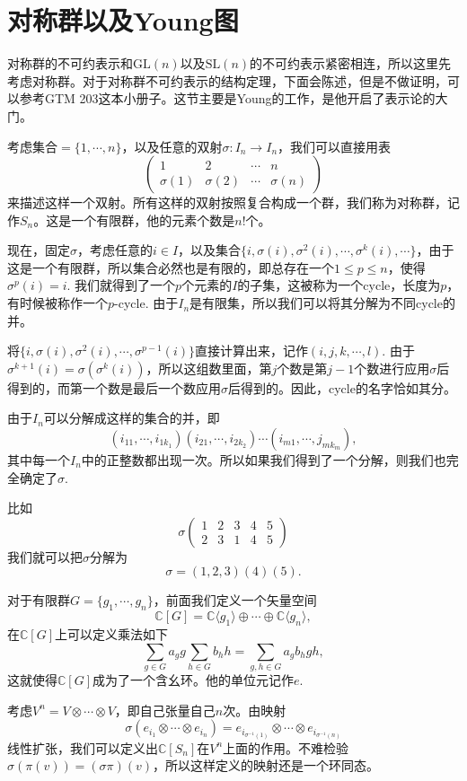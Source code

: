 \documentclass[9pt]{extarticle}
\newcommand{\cc}{\mathbb{C}}
\begin{document}
\section{对称群以及Young图}

对称群的不可约表示和$\mathrm{GL}(n)$以及$\mathrm{SL}(n)$的不可约表示紧密相连，所以这里先考虑对称群。对于对称群不可约表示的结构定理，下面会陈述，但是不做证明，可以参考GTM 203这本小册子。这节主要是Young的工作，是他开启了表示论的大门。

\para 考虑集合$=\{1,\cdots,n\}$，以及任意的双射$\sigma : I_n\to I_n$，我们可以直接用表
\[
	\begin{pmatrix}
	1&2&\cdots &n\\
	\sigma(1)&\sigma(2)&\cdots &\sigma(n)
	\end{pmatrix}
\]
来描述这样一个双射。所有这样的双射按照复合构成一个群，我们称为对称群，记作$S_n$。这是一个有限群，他的元素个数是$n!$个。

现在，固定$\sigma$，考虑任意的$i\in I$，以及集合$\{i,\sigma(i),\sigma^2(i),\cdots,\sigma^k(i),\cdots\}$，由于这是一个有限群，所以集合必然也是有限的，即总存在一个$1\leq p\leq n$，使得$\sigma^p(i)=i$. 我们就得到了一个$p$个元素的$I$的子集，这被称为一个cycle，长度为$p$，有时候被称作一个$p$-cycle. 由于$I_n$是有限集，所以我们可以将其分解为不同cycle的并。

将$\{i,\sigma(i),\sigma^2(i),\cdots,\sigma^{p-1}(i)\}$直接计算出来，记作$(i,j,k,\cdots,l)$. 由于$\sigma^{k+1}(i)=\sigma(\sigma^k(i))$，所以这组数里面，第$j$个数是第$j-1$个数进行应用$\sigma$后得到的，而第一个数是最后一个数应用$\sigma$后得到的。因此，cycle的名字恰如其分。

由于$I_n$可以分解成这样的集合的并，即
\[
	(i_{11},\cdots,i_{1k_1})(i_{21},\cdots,i_{2k_2})\cdots (i_{m1},\cdots,j_{mk_m}),
\]
其中每一个$I_n$中的正整数都出现一次。所以如果我们得到了一个分解，则我们也完全确定了$\sigma$.

比如
\[
	\sigma\begin{pmatrix}
	1&2&3&4&5\\
	2&3&1&4&5
	\end{pmatrix}
\]
我们就可以把$\sigma$分解为
\[
	\sigma=(1,2,3)(4)(5).
\]

\para 对于有限群$G=\{g_1,\cdots,g_n\}$，前面我们定义一个矢量空间
\[
	\cc [G]=\cc\langle g_1\rangle \oplus \cdots \oplus \cc\langle g_n\rangle,
\]
在$\cc [G]$上可以定义乘法如下
\[
	\sum_{g\in G} a_g g \sum_{h\in G} b_h h=\sum_{g,h\in G}a_gb_h gh,
\]
这就使得$\cc [G]$成为了一个含幺环。他的单位元记作$e$.

\para 考虑$V^n=V\otimes\cdots \otimes V$，即自己张量自己$n$次。由映射
\[
	\sigma(e_{i_1}\otimes\cdots\otimes e_{i_n})=e_{i_{\sigma^{-1}(1)}}\otimes\cdots\otimes e_{i_{\sigma^{-1}(n)}}
\]
线性扩张，我们可以定义出$\cc [S_n]$在$V^n$上面的作用。不难检验$\sigma(\pi(v))=(\sigma\pi)(v)$，所以这样定义的映射还是一个环同态。
\end{document}
